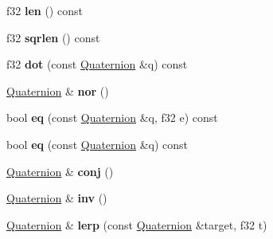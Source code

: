 \begin{DoxyCompactItemize}
\item 
f32 {\bfseries len} () const \hypertarget{classDE_1_1Quaternion_ab8f9a95f1b2c532a8aece1c6cd04a76a}{}\label{classDE_1_1Quaternion_ab8f9a95f1b2c532a8aece1c6cd04a76a}

\item 
f32 {\bfseries sqrlen} () const \hypertarget{classDE_1_1Quaternion_a3ae52b98d4d41cbe4bb596d864951137}{}\label{classDE_1_1Quaternion_a3ae52b98d4d41cbe4bb596d864951137}

\item 
f32 {\bfseries dot} (const \hyperlink{classDE_1_1Quaternion}{Quaternion} \&q) const \hypertarget{classDE_1_1Quaternion_a7daa47280a1fe53ea68c674c46066bc5}{}\label{classDE_1_1Quaternion_a7daa47280a1fe53ea68c674c46066bc5}

\item 
\hyperlink{classDE_1_1Quaternion}{Quaternion} \& {\bfseries nor} ()\hypertarget{classDE_1_1Quaternion_aef4f30484499792f39b86139bb2e4773}{}\label{classDE_1_1Quaternion_aef4f30484499792f39b86139bb2e4773}

\item 
bool {\bfseries eq} (const \hyperlink{classDE_1_1Quaternion}{Quaternion} \&q, f32 e) const \hypertarget{classDE_1_1Quaternion_adce228837e893238f875a09e92a1ab8b}{}\label{classDE_1_1Quaternion_adce228837e893238f875a09e92a1ab8b}

\item 
bool {\bfseries eq} (const \hyperlink{classDE_1_1Quaternion}{Quaternion} \&q) const \hypertarget{classDE_1_1Quaternion_ae48d93a80a27d1e8e3e61f77cac26220}{}\label{classDE_1_1Quaternion_ae48d93a80a27d1e8e3e61f77cac26220}

\item 
\hyperlink{classDE_1_1Quaternion}{Quaternion} \& {\bfseries conj} ()\hypertarget{classDE_1_1Quaternion_a34f7d52202de842302965e579845110b}{}\label{classDE_1_1Quaternion_a34f7d52202de842302965e579845110b}

\item 
\hyperlink{classDE_1_1Quaternion}{Quaternion} \& {\bfseries inv} ()\hypertarget{classDE_1_1Quaternion_a15439b8377007d11707aec0e225743b4}{}\label{classDE_1_1Quaternion_a15439b8377007d11707aec0e225743b4}

\item 
\hyperlink{classDE_1_1Quaternion}{Quaternion} \& {\bfseries lerp} (const \hyperlink{classDE_1_1Quaternion}{Quaternion} \&target, f32 t)\hypertarget{classDE_1_1Quaternion_a76110c16875cb15ac7a6c8feb79ce0cb}{}\label{classDE_1_1Quaternion_a76110c16875cb15ac7a6c8feb79ce0cb}


\end{DoxyCompactItemize}

